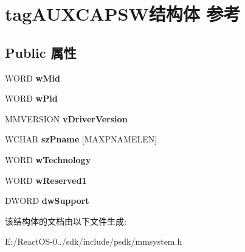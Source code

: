 \hypertarget{structtag_a_u_x_c_a_p_s_w}{}\section{tag\+A\+U\+X\+C\+A\+P\+S\+W结构体 参考}
\label{structtag_a_u_x_c_a_p_s_w}
\subsection*{Public 属性}
\begin{DoxyCompactItemize}
\item 
\mbox{\label{structtag_a_u_x_c_a_p_s_w_afb7a9e1f48df433ba69cee4a39f5b1d5}} 
W\+O\+RD {\bfseries w\+Mid}
\item 
\mbox{\label{structtag_a_u_x_c_a_p_s_w_a3030a23211e3aae3e61ef6d1a78d1cea}} 
W\+O\+RD {\bfseries w\+Pid}
\item 
\mbox{\label{structtag_a_u_x_c_a_p_s_w_a3dbc6078367eda91cd25137695ae18b2}} 
M\+M\+V\+E\+R\+S\+I\+ON {\bfseries v\+Driver\+Version}
\item 
\mbox{\label{structtag_a_u_x_c_a_p_s_w_aedf3300e988c29684a6ecefe90602183}} 
W\+C\+H\+AR {\bfseries sz\+Pname} \mbox{[}M\+A\+X\+P\+N\+A\+M\+E\+L\+EN\mbox{]}
\item 
\mbox{\label{structtag_a_u_x_c_a_p_s_w_a0b3e5157dd1a6ed252083c98f5b8ab18}} 
W\+O\+RD {\bfseries w\+Technology}
\item 
\mbox{\label{structtag_a_u_x_c_a_p_s_w_a69b8ff5dc8cdacad9646099b1aa286f8}} 
W\+O\+RD {\bfseries w\+Reserved1}
\item 
\mbox{\label{structtag_a_u_x_c_a_p_s_w_a2c5564cde4eb1ffeb650ecf03ffcaa5f}} 
D\+W\+O\+RD {\bfseries dw\+Support}
\end{DoxyCompactItemize}


该结构体的文档由以下文件生成\+:\begin{DoxyCompactItemize}
\item 
E\+:/\+React\+O\+S-\/0../sdk/include/psdk/mmsystem.\+h\end{DoxyCompactItemize}
